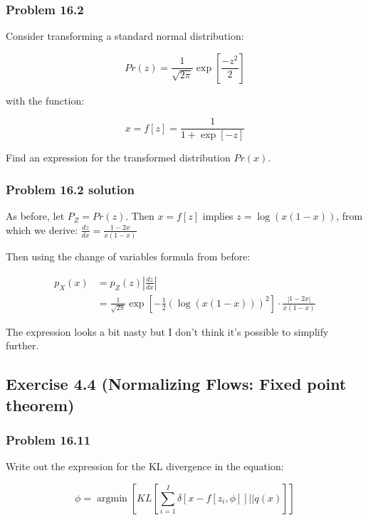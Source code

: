 \documentclass[
10pt, %
a4paper, %
oneside, %
headinclude,footinclude, %
BCOR5mm, %
]{scrartcl}
\DeclareMathOperator*{\argmin}{argmin} %
\begin{document}
\subsubsection*{Problem 16.2}

Consider transforming a standard normal distribution:

\begin{equation*}
  Pr(z) = \frac{1}{\sqrt{2\pi}} \exp \left[\frac{-z^2}{2}\right]
\end{equation*}

with the function:

\begin{equation*}
  x = f[z] = \frac{1}{1 + \exp[-z]}
\end{equation*}

Find an expression for the transformed distribution $Pr(x)$.

\subsubsection*{Problem 16.2 solution}

As before, let $P_Z = Pr(z)$. Then $x = f[z]$ implies $z = \log(x(1-x))$, from which we derive: $\frac{dz}{dx} = \frac{1-2x}{x(1-x)}$

Then using the change of variables formula from before:

\begin{align*}
  p_X(x) &= p_Z(z) \left|\frac{dz}{dx}\right| \\
  &= \frac{1}{\sqrt{2\pi}} \exp \left[-\frac{1}{2}(\log(x(1-x)))^2 \right] \cdot \frac{|1-2x|}{x(1-x)}
\end{align*}

The expression looks a bit nasty but I don't think it's possible to simplify further.

\newpage

\subsection*{Exercise 4.4 (Normalizing Flows: Fixed point theorem)}

\subsubsection*{Problem 16.11}

Write out the expression for the KL divergence in the equation:

\begin{equation*}
  \phi = \argmin \left[ KL \left[ \sum_{i=1}^I \delta[x-f[z_i,\phi]] || q(x) \right] \right]
\end{equation*}
\end{document}
